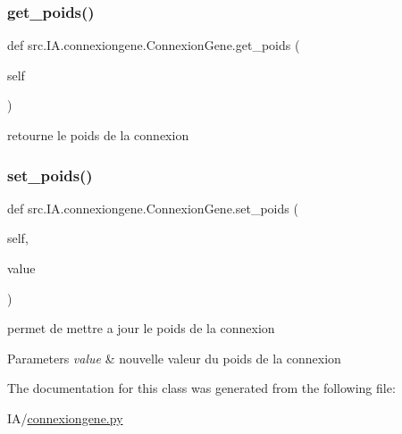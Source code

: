 \subsubsection{\texorpdfstring{get\+\_\+poids()}{get\_poids()}}
{\footnotesize\ttfamily def src.\+I\+A.\+connexiongene.\+Connexion\+Gene.\+get\+\_\+poids (\begin{DoxyParamCaption}\item[{}]{self }\end{DoxyParamCaption})}



retourne le poids de la connexion 

\mbox{\label{classsrc_1_1_i_a_1_1connexiongene_1_1_connexion_gene_ad6f8d0dc7d4b9a76c702dc1c014808d2}} 
\subsubsection{\texorpdfstring{set\+\_\+poids()}{set\_poids()}}
{\footnotesize\ttfamily def src.\+I\+A.\+connexiongene.\+Connexion\+Gene.\+set\+\_\+poids (\begin{DoxyParamCaption}\item[{}]{self,  }\item[{}]{value }\end{DoxyParamCaption})}



permet de mettre a jour le poids de la connexion 


\begin{DoxyParams}{Parameters}
{\em value} & nouvelle valeur du poids de la connexion \\
\hline
\end{DoxyParams}


The documentation for this class was generated from the following file\+:\begin{DoxyCompactItemize}
\item 
I\+A/\hyperlink{connexiongene_8py}{connexiongene.\+py}\end{DoxyCompactItemize}
